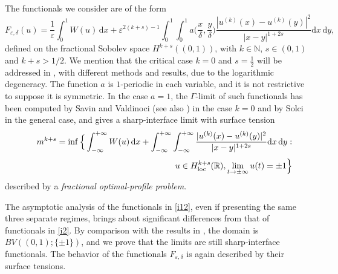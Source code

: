 \documentclass{article}
\theoremstyle{definition}
\newcommand{\de}{\mathrm{d}}
\newcommand{\e}{\varepsilon}
\def\e{\varepsilon}
\begin{document}
The functionals we consider are of the form
\begin{equation}\label{i12}
F_{\e,\delta}(u)= \frac1\e\int_0^1 W(u)\,\de x+\e^{2(k+s)-1}\int_0^1\int_0^1a\Big(\frac{x}\delta,\frac{y}\delta\Big)
\frac{|u^{(k)}(x)-u^{(k)}(y)|^2}{|x-y|^{1+2s}}\de x\,\de y,
\end{equation}
defined on the fractional Sobolev space $H^{k+s}((0,1))$, with $k\in\mathbb N$, $s\in (0,1)$ and $k+s>1/2$. We mention that the critical case $k=0$ and $s=\frac{1}{2}$ will be addressed in \cite{Braides-Abdilaziz}, with different methods and results, due to the logarithmic degeneracy.
The function $a$ is $1$-periodic in each variable, and it is not restrictive to suppose it is symmetric.
In the case $a=1$, the $\Gamma$-limit of such functionals has been computed by Savin and Valdinoci 
\cite{SAVIN2012479} (see also \cite{PalatucciVincini}) in the case $k=0$ and by Solci \cite{Solci_2024} in the general case, and gives a sharp-interface limit with surface tension
\begin{eqnarray}\label{i13}\nonumber
&&\hskip -1cm m^{k+s}=\inf\Big\{\int_{-\infty}^{+\infty} W(u)\,\de x+\int_{-\infty}^{+\infty}\int_{-\infty}^{+\infty} \frac{|u^{(k)}(x)-u^{(k)}(y)|^2}{|x-y|^{1+2s}}\de x\,\de y :\\[3pt] \nonumber
&&\hskip 6cm
u\in H^{k+s}_{\rm loc}(\mathbb R), \lim_{t\to \pm \infty} u(t)=\pm1
\Big\}\\
\end{eqnarray}
described by a {\em fractional optimal-profile problem}.

The asymptotic analysis of the functionals in \eqref{i12}, even if presenting the same three separate regimes, brings about significant differences from that of functionals in \eqref{i2}. By comparison with the results in \cite{Solci_2024}, the domain is $BV((0,1);\{\pm 1\})$, and we prove that the limits are still sharp-interface functionals. The behavior of the functionals $F_{\e,\delta}$ is again described by their surface tensions. 
\end{document}

